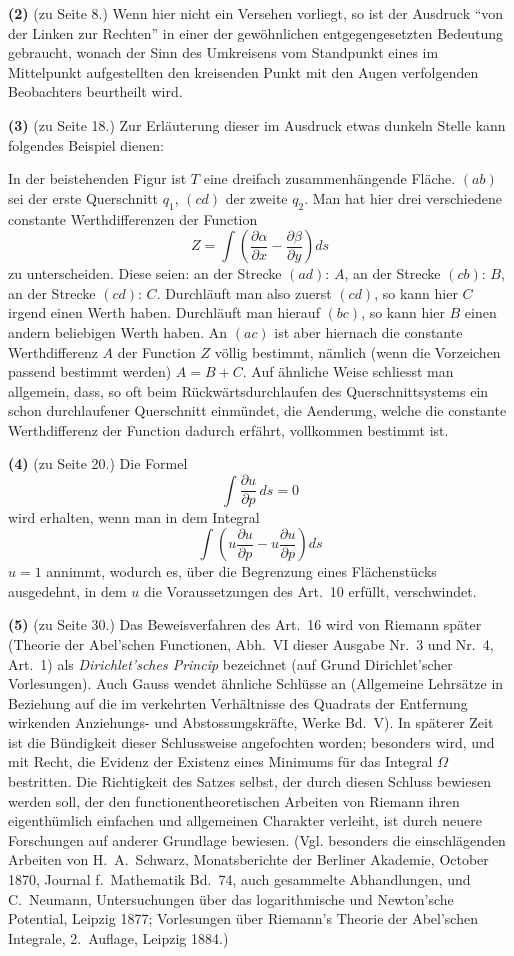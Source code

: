 \documentclass[12pt,a4paper]{book}
\theoremstyle{definition}
\theoremstyle{remark}
\begin{document}
\textbf{(2)} (zu Seite 8.) Wenn hier nicht ein Versehen vorliegt, so ist der Ausdruck ``von der Linken zur Rechten'' in einer der gewöhnlichen entgegengesetzten Bedeutung gebraucht, wonach der Sinn des Umkreisens vom Standpunkt eines im Mittelpunkt aufgestellten den kreisenden Punkt mit den Augen verfolgenden Beobachters beurtheilt wird.

\textbf{(3)} (zu Seite 18.) Zur Erläuterung dieser im Ausdruck etwas dunkeln Stelle kann folgendes Beispiel dienen:

In der beistehenden Figur ist $T$ eine dreifach zusammenhängende Fläche. $(ab)$ sei der erste Querschnitt $q_1$, $(cd)$ der zweite $q_2$. Man hat hier drei verschiedene constante Werthdifferenzen der Function
\[
Z = \int \left(\frac{\partial \alpha}{\partial x} - \frac{\partial \beta}{\partial y}\right) ds
\]
zu unterscheiden. Diese seien: an der Strecke $(ad)$: $A$, an der Strecke $(cb)$: $B$, an der Strecke $(cd)$: $C$. Durchläuft man also zuerst $(cd)$, so kann hier $C$ irgend einen Werth haben. Durchläuft man hierauf $(bc)$, so kann hier $B$ einen andern beliebigen Werth haben. An $(ac)$ ist aber hiernach die constante Werthdifferenz $A$ der Function $Z$ völlig bestimmt, nämlich (wenn die Vorzeichen passend bestimmt werden) $A = B + C$. Auf ähnliche Weise schliesst man allgemein, dass, so oft beim Rückwärtsdurchlaufen des Querschnittsystems ein schon durchlaufener Querschnitt einmündet, die Aenderung, welche die constante Werthdifferenz der Function dadurch erfährt, vollkommen bestimmt ist.

\textbf{(4)} (zu Seite 20.) Die Formel
\[
\int \frac{\partial u}{\partial p}\, ds = 0
\]
wird erhalten, wenn man in dem Integral
\[
\int \left( u \frac{\partial u}{\partial p} - u \frac{\partial u}{\partial p} \right) ds
\]
$u = 1$ annimmt, wodurch es, über die Begrenzung eines Flächenstücks ausgedehnt, in dem $u$ die Voraussetzungen des Art.~10 erfüllt, verschwindet.

\textbf{(5)} (zu Seite 30.) Das Beweisverfahren des Art.~16 wird von Riemann später (Theorie der Abel'schen Functionen, Abh.~VI dieser Ausgabe Nr.~3 und Nr.~4, Art.~1) als \textit{Dirichlet'sches Princip} bezeichnet (auf Grund Dirichlet'scher Vorlesungen). Auch Gauss wendet ähnliche Schlüsse an (Allgemeine Lehrsätze in Beziehung auf die im verkehrten Verhältnisse des Quadrats der Entfernung wirkenden Anziehungs- und Abstossungskräfte, Werke Bd.~V). In späterer Zeit ist die Bündigkeit dieser Schlussweise angefochten worden; besonders wird, und mit Recht, die Evidenz der Existenz eines Minimums für das Integral $\Omega$ bestritten. Die Richtigkeit des Satzes selbst, der durch diesen Schluss bewiesen werden soll, der den functionentheoretischen Arbeiten von Riemann ihren eigenthümlich einfachen und allgemeinen Charakter verleiht, ist durch neuere Forschungen auf anderer Grundlage bewiesen. (Vgl. besonders die einschlägenden Arbeiten von H.~A.~Schwarz, Monatsberichte der Berliner Akademie, October 1870, Journal f.~Mathematik Bd.~74, auch gesammelte Abhandlungen, und C.~Neumann, Untersuchungen über das logarithmische und Newton'sche Potential, Leipzig 1877; Vorlesungen über Riemann's Theorie der Abel'schen Integrale, 2.~Auflage, Leipzig 1884.)
\end{document}
